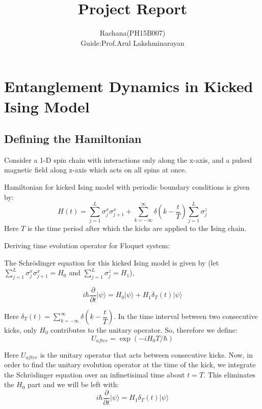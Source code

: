 \documentclass[11pt,a4paper]{article}
\author{Rachana(PH15B007)\\Guide:Prof.Arul Lakshminarayan}
\title{Project Report}
\begin{document}
\maketitle
\newpage
	\tableofcontents 
	\pagebreak
	
		 \section{Entanglement Dynamics in Kicked Ising Model }
		 
		 \subsection{Defining the Hamiltonian}
		 
	      Consider a 1-D spin chain with interactions only along the x-axis, and a pulsed magnetic field along z-axis which acts on all spins at once.  
		 
		 Hamiltonian for kicked Ising model with periodic boundary conditions is given by:
		 \begin{equation}\label{key}
		 H(t)= \sum_{j=1}^{L}\sigma_{j}^{x} \sigma_{j+1}^{x} + \sum_{k=-\infty}^{\infty}\delta(k-\dfrac{t}{T})\sum_{j=1}^{L}\sigma_{j}^{z}
		 \end{equation}
		 Here $T$ is the time period after which the kicks are applied to the Ising chain. 
		
Deriving time evolution operator for Floquet system:

The Schr\"{o}dinger equation for this kicked Ising model is given by (let $\sum_{j=1}^{L}\sigma_{j}^{x} \sigma_{j+1}^{x}  = H_{0} $ and $\sum_{j=1}^{L}\sigma_{j}^{z} = H_{1}$),

\begin{equation}
i \hbar \dfrac{\partial}{\partial t}|\psi\rangle = H_{0}|\psi\rangle + H_{1} \delta_{T}(t) |\psi\rangle
\end{equation}

Here $\delta_{T}(t) =  \sum_{k=-\infty}^{\infty}\delta(k-\dfrac{t}{T})$. In the time interval between two consecutive kicks, only $H_{0}$ contributes to the unitary operator. So, therefore we define:
\begin{equation}
U_{after} = \exp(-iH_{0}T/\hbar)
\end{equation}

Here $U_{after}$ is the unitary operator that acts between consecutive kicks. Now, in order to find the unitary evolution operator at the time of the kick, we integrate the Schr\"{o}dinger equation over an infinetisimal time about $t = T $. This eliminates the $H_{0}$ part and we will be left with:
\begin{equation}
i\hbar \dfrac{\partial}{\partial t} |\psi\rangle = H_{1}\delta_{T}(t) |\psi\rangle
\end{equation}
\end{document}
